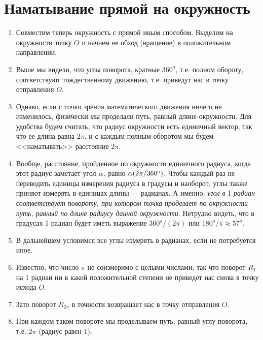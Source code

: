 \section{Наматывание прямой на окружность}


\begin{enumerate}
\item Совместим теперь окружность с прямой иным способом. Выделим на окружности точку $O$ и начнем ее обход (вращение) в положительном направлении.
\item Выше мы видели, что углы поворота, кратные $360^o$, т.е. полном обороту, соответствуют тождественному движению, т.е. приведут нас в точку отправления $O$.
\item Однако, если с точки зрения математического движения ничего не изменилось, физически мы проделали путь, равный длине окружности. Для удобства будем считать, что радиус окружности есть единичный вектор, так что ее длина равна $2\pi$, и с каждым полным оборотом мы будем <<наматывать>> расстояние $2\pi$.
\item Вообще, расстояние, пройденное по окружности единичного радиуса, когда этот радиус заметает угол $\alpha$, равно $\alpha(2\pi/360^o)$. Чтобы каждый раз не переводить единицы измерения радиуса в градусы и наоборот, углы также приняот измерять в единицах длины --- радианах. А именно, \textit{угол в} 1 \textit{радиан соответствует повороту, при котором точка проделает по окружности путь, равный по длине радиусу данной окружности}. Нетрудно видеть, что в градусах 1 радиан будет иметь выражение $360^o/(2\pi)$ или $180^o/\pi \approx 57^o$.
\item В дальнейшем условимся все углы измерять в радианах, если не потребуется иное.
\item Известно, что число $\pi$ не соизмеримо с целыми числами, так что поворот $R_1$ на 1 радиан ни в какой положительной степени не приведет нас снова в точку исхода $O$.
\item Зато поворот $R_{2\pi}$ в точности возвращает нас в точку отправления $O$.
\item При каждом таком повороте мы проделываем путь, равный углу поворота, т.е. $2\pi$ (радиус равен 1).

\end{enumerate}
